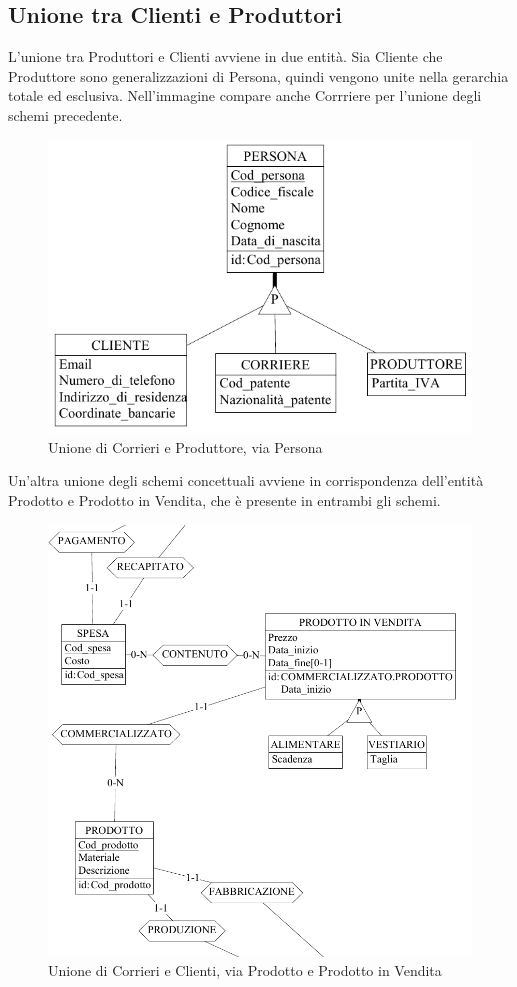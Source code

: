 \documentclass[a4paper,12pt]{report}
\begin{document}
\subsection{Unione tra Clienti e Produttori}

L'unione tra Produttori e Clienti avviene in due entità. Sia Cliente che Produttore sono generalizzazioni di Persona, quindi vengono unite nella gerarchia totale ed esclusiva. Nell'immagine compare anche Corrriere per l'unione degli schemi precedente.
\begin{figure}[h]
	\centering{}
	\includegraphics[width=\textwidth]{img/Unione-Clienti-Produttori1.pdf}
	\caption{Unione di Corrieri e Produttore, via Persona}
\end{figure}
Un'altra unione degli schemi concettuali avviene in corrispondenza dell'entità Prodotto e Prodotto in Vendita, che è presente in entrambi gli schemi. 
\begin{figure}[h]
	\centering{}
	\includegraphics[width=\textwidth]{img/Unione-Clienti-Produttori2.pdf}
	\caption{Unione di Corrieri e Clienti, via Prodotto e Prodotto in Vendita}
\end{figure}
\end{document}
